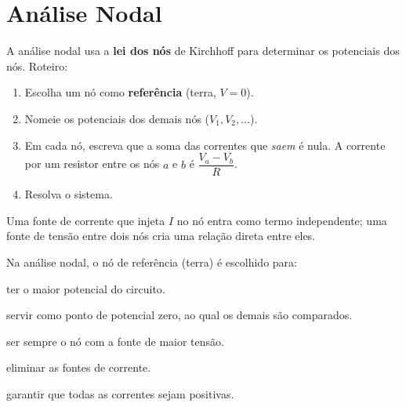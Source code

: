 \section{Análise Nodal}

\begin{conceito}
A análise nodal usa a \textbf{lei dos nós} de Kirchhoff para determinar os potenciais
dos nós. Roteiro:
\begin{enumerate}[leftmargin=1.7em,itemsep=1pt,topsep=2pt]
\item Escolha um nó como \textbf{referência} (terra, $V=0$).
\item Nomeie os potenciais dos demais nós ($V_1, V_2, \dots$).
\item Em cada nó, escreva que a soma das correntes que \emph{saem} é nula. A
      corrente por um resistor entre os nós $a$ e $b$ é
      $\dfrac{V_a - V_b}{R}$.
\item Resolva o sistema.
\end{enumerate}
Uma fonte de corrente que injeta $I$ no nó entra como termo independente; uma
fonte de tensão entre dois nós cria uma relação direta entre eles.
\end{conceito}

\legendaniveis

\blocofixacao

\begin{questao}[1]{}
Na análise nodal, o nó de referência (terra) é escolhido para:
\begin{alternativas}
\item ter o maior potencial do circuito.
\item servir como ponto de potencial zero, ao qual os demais são comparados.
\item ser sempre o nó com a fonte de maior tensão.
\item eliminar as fontes de corrente.
\item garantir que todas as correntes sejam positivas.
\end{alternativas}
\end{questao}

